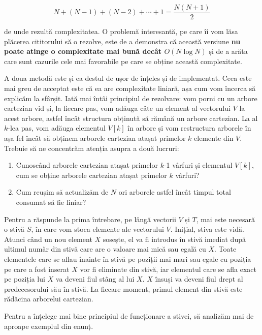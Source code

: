 \begin{equation}
  N + (N-1) + (N-2) + \cdots + 1 = \frac{N(N + 1)}{2}
\end{equation}

de unde rezultă complexitatea. O problemă interesantă, pe care îi vom lăsa
plăcerea cititorului să o rezolve, este de a demonstra că această versiune
{\bf nu poate atinge o complexitate mai bună decât $O(N \log N)$} și de a
arăta care sunt cazurile cele mai favorabile pe care se obține această
complexitate.

A doua metodă este și ea destul de ușor de înțeles și de implementat. Ceea
este mai greu de acceptat este că ea are complexitate liniară, așa cum vom
încerca să explicăm la sfârșit. Iată mai întâi principiul de rezolvare: vom
porni cu un arbore cartezian vid și, la fiecare pas, vom adăuga câte un
element al vectorului $V$ la acest arbore, astfel încât structura obținută să
rămână un arbore cartezian. La al $k$-lea pas, vom adăuga elementul $V[k]$ în
arbore și vom restructura arborele în așa fel încât să obținem arborele
cartezian atașat primelor $k$ elemente din $V$. Trebuie să ne concentrăm
atenția asupra a două lucruri:

\begin{enumerate}

\item Cunoscând arborele cartezian atașat primelor $k$-1 vârfuri și elementul
  $V[k]$, cum se obține arborele cartezian atașat primelor $k$ vârfuri?

\item Cum reușim să actualizăm de $N$ ori arborele astfel încât timpul total
  consumat să fie liniar?

\end{enumerate}

Pentru a răspunde la prima întrebare, pe lângă vectorii $V$ și $T$, mai este
necesară o stivă $S$, în care vom stoca elemente ale vectorului $V$. Inițial,
stiva este vidă. Atunci când un nou element $X$ sosește, el va fi introdus în
stivă imediat după ultimul număr din stivă care are o valoare mai mică sau
egală cu $X$. Toate elementele care se aflau înainte în stivă pe poziții mai
mari sau egale cu poziția pe care a fost inserat $X$ vor fi eliminate din
stivă, iar elementul care se afla exact pe poziția lui $X$ va deveni fiul
stâng al lui $X$. $X$ însuși va deveni fiul drept al predecesorului său în
stivă. La fiecare moment, primul element din stivă este rădăcina arborelui
cartezian.

Pentru a înțelege mai bine principiul de funcționare a stivei, să analizăm mai
de aproape exemplul din enunț.

